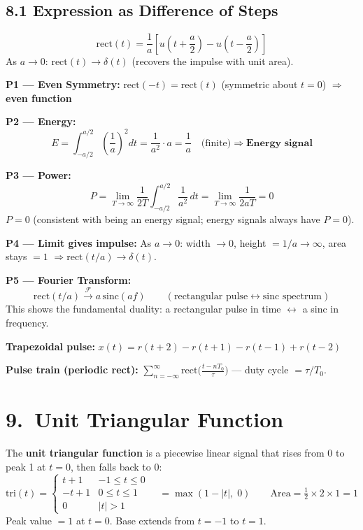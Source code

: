 \documentclass[10pt,a4paper]{article}
\begin{document}
\subsection*{8.1 Expression as Difference of Steps}

\[
\mathrm{rect}(t) = \frac{1}{a}\left[u\!\left(t + \frac{a}{2}\right) - u\!\left(t - \frac{a}{2}\right)\right]
\]
As $a \to 0$: $\mathrm{rect}(t) \to \delta(t)$ (recovers the impulse with unit area).

\begin{propbox}
\textbf{P1 --- Even Symmetry:}
$\text{rect}(-t) = \text{rect}(t)$ (symmetric about $t=0$) $\Rightarrow$ \textbf{even function}

\medskip
\textbf{P2 --- Energy:}
\[
  E = \int_{-a/2}^{a/2} \left(\frac{1}{a}\right)^2 dt = \frac{1}{a^2}\cdot a = \frac{1}{a} \quad \text{(finite)} \Rightarrow \textbf{Energy signal}
\]

\medskip
\textbf{P3 --- Power:}
\[
  P = \lim_{T\to\infty}\frac{1}{2T}\int_{-a/2}^{a/2}\frac{1}{a^2}\,dt = \lim_{T\to\infty}\frac{1}{2aT} = 0
\]
$P=0$ (consistent with being an energy signal; energy signals always have $P=0$).

\medskip
\textbf{P4 --- Limit gives impulse:}
As $a\to0$: width $\to0$, height $=1/a\to\infty$, area stays $=1$ $\Rightarrow \text{rect}(t/a)\to\delta(t)$.

\medskip
\textbf{P5 --- Fourier Transform:}
\[
  \text{rect}(t/a) \xrightarrow{\mathcal{F}} a\,\text{sinc}(af) \qquad (\text{rectangular pulse} \leftrightarrow \text{sinc spectrum})
\]
This shows the fundamental duality: a rectangular pulse in time $\leftrightarrow$ a sinc in frequency.
\end{propbox}

\begin{exbox}
\textbf{Trapezoidal pulse:} $x(t) = r(t+2)-r(t+1)-r(t-1)+r(t-2)$

\textbf{Pulse train (periodic rect):} $\sum_{n=-\infty}^{\infty}\text{rect}\bigl(\tfrac{t-nT_0}{\tau}\bigr)$ --- duty cycle $= \tau/T_0$.
\end{exbox}

\section{9.\ Unit Triangular Function}

\begin{defbox}
The \textbf{unit triangular function} is a piecewise linear signal that rises from 0 to peak 1 at $t=0$, then falls back to 0:
\[
  \text{tri}(t) = \begin{cases} t+1 & -1\leq t\leq 0 \\ -t+1 & 0\leq t\leq 1 \\ 0 & |t|>1 \end{cases}
  \quad = \max(1-|t|,\;0) \qquad\text{Area}=\tfrac{1}{2}\times 2\times 1=1
\]
Peak value $= 1$ at $t = 0$. Base extends from $t = -1$ to $t = 1$.
\end{defbox}
\end{document}
